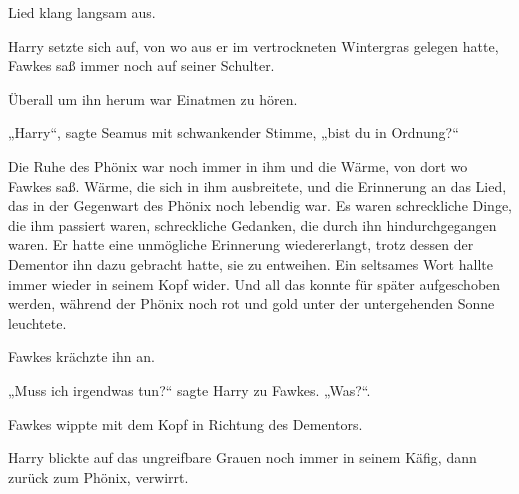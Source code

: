 
 Lied klang langsam aus.

\hplettrineextrapara
Harry setzte sich auf, von wo aus er im vertrockneten Wintergras gelegen hatte, Fawkes saß immer noch auf seiner Schulter.

Überall um ihn herum war Einatmen zu hören.

„Harry“, sagte Seamus mit schwankender Stimme, „bist du in Ordnung?“

Die Ruhe des Phönix war noch immer in ihm und die Wärme, von dort wo Fawkes saß. Wärme, die sich in ihm ausbreitete, und die Erinnerung an das Lied, das in der Gegenwart des Phönix noch lebendig war. Es waren schreckliche Dinge, die ihm passiert waren, schreckliche Gedanken, die durch ihn hindurchgegangen waren. Er hatte eine unmögliche Erinnerung wiedererlangt, trotz dessen der Dementor ihn dazu gebracht hatte, sie zu entweihen. Ein seltsames Wort hallte immer wieder in seinem Kopf wider. Und all das konnte für später aufgeschoben werden, während der Phönix noch rot und gold unter der untergehenden Sonne leuchtete.

Fawkes krächzte ihn an.

„Muss ich irgendwas tun?“ sagte Harry zu Fawkes. „Was?“.

Fawkes wippte mit dem Kopf in Richtung des Dementors.

Harry blickte auf das ungreifbare Grauen noch immer in seinem Käfig, dann zurück zum Phönix, verwirrt.

